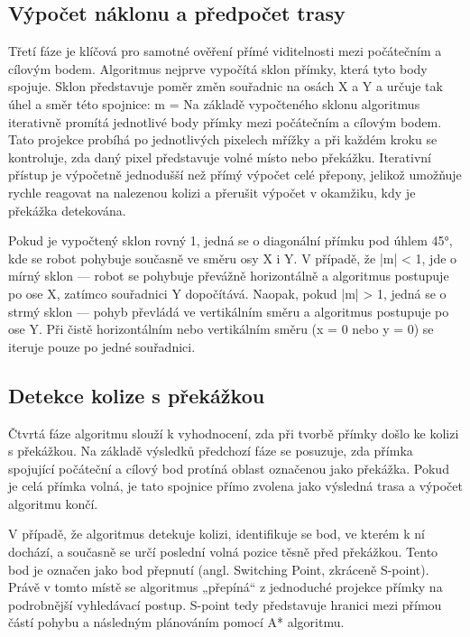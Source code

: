 \documentclass[10pt, a4paper]{article}
\begin{document}
\subsection{Výpočet náklonu a předpočet trasy}
Třetí fáze je klíčová pro samotné ověření přímé viditelnosti mezi počátečním a cílovým bodem.
Algoritmus nejprve vypočítá sklon přímky, která tyto body spojuje.
Sklon představuje poměr změn souřadnic na osách X a Y a určuje tak úhel a směr této spojnice:
m = 
Na základě vypočteného sklonu algoritmus iterativně promítá jednotlivé body přímky mezi počátečním a cílovým bodem.
Tato projekce probíhá po jednotlivých pixelech mřížky a při každém kroku se kontroluje, zda daný pixel představuje volné místo nebo překážku.
Iterativní přístup je výpočetně jednodušší než přímý výpočet celé přepony, jelikož umožňuje rychle reagovat na nalezenou kolizi a přerušit výpočet v okamžiku, kdy je překážka detekována.

Pokud je vypočtený sklon rovný 1, jedná se o diagonální přímku pod úhlem 45°, kde se robot pohybuje současně ve směru osy X i Y.
V případě, že |m| < 1, jde o mírný sklon — robot se pohybuje převážně horizontálně a algoritmus postupuje po ose X, zatímco souřadnici Y dopočítává.
Naopak, pokud |m| > 1, jedná se o strmý sklon — pohyb převládá ve vertikálním směru a algoritmus postupuje po ose Y.
Při čistě horizontálním nebo vertikálním směru (x = 0 nebo y = 0) se iteruje pouze po jedné souřadnici.

\subsection{Detekce kolize s překážkou}
Čtvrtá fáze algoritmu slouží k vyhodnocení, zda při tvorbě přímky došlo ke kolizi s překážkou.
Na základě výsledků předchozí fáze se posuzuje, zda přímka spojující počáteční a cílový bod protíná oblast označenou jako překážka.
Pokud je celá přímka volná, je tato spojnice přímo zvolena jako výsledná trasa a výpočet algoritmu končí.

V případě, že algoritmus detekuje kolizi, identifikuje se bod, ve kterém k ní dochází, a současně se určí poslední volná pozice těsně před překážkou.
Tento bod je označen jako bod přepnutí (angl. Switching Point, zkráceně S-point).
Právě v tomto místě se algoritmus „přepíná“ z jednoduché  projekce přímky na podrobnější vyhledávací postup.
S-point tedy představuje hranici mezi přímou částí pohybu a následným plánováním pomocí A* algoritmu.
\end{document}

